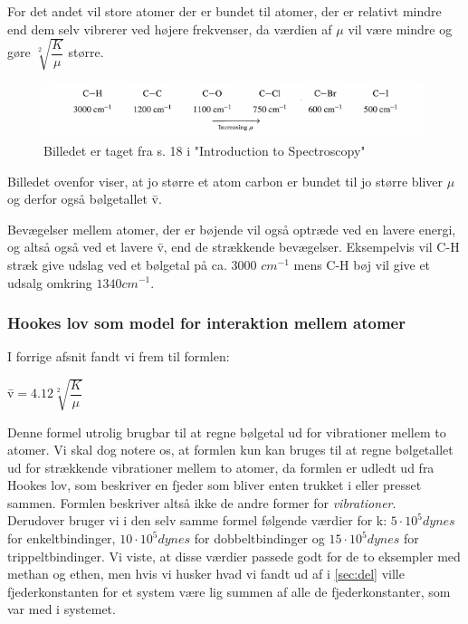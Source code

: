 For det andet vil store atomer der er bundet til atomer, der er relativt mindre end dem selv vibrerer ved højere frekvenser, da værdien af $\mu$ vil være mindre og gøre $\sqrt[2]{\dfrac{K}{\mu}}$ større. 
\\

\begin{figure}
\includegraphics[scale=1]{Billeder/udklip}
\caption{Billedet er taget fra s. 18 i "Introduction to Spectroscopy"}
\end{figure}

Billedet ovenfor viser, at jo større et atom carbon er bundet til jo større bliver $\mu$ og derfor også bølgetallet \={v}.

Bevægelser mellem atomer, der er bøjende vil også optræde ved en lavere energi, og altså også ved et lavere \={v}, end de strækkende bevægelser. Eksempelvis vil C-H stræk give udslag ved et bølgetal på ca. 3000 $cm^{-1}$ mens C-H bøj vil give et udsalg omkring $1340cm^{-1}$.

\subsubsection{Hookes lov som model for interaktion mellem atomer}
I forrige afsnit fandt vi frem til formlen:

\begin{center}
\={v}$=4.12 \sqrt[2]{\dfrac{K}{\mu}}$
\end{center}

Denne formel utrolig brugbar til at regne bølgetal ud for vibrationer mellem to atomer. Vi skal dog notere os, at formlen kun kan bruges til at regne bølgetallet ud for strækkende vibrationer mellem to atomer, da formlen er udledt ud fra Hookes lov, som beskriver en fjeder som bliver enten trukket i eller presset sammen. Formlen beskriver altså ikke de andre former for \emph{vibrationer}.
\\

Derudover bruger vi i den selv samme formel følgende værdier for k: $5 \cdot 10^5 dynes$ for enkeltbindinger, $10 \cdot 10^5 dynes$ for dobbeltbindinger og $15 \cdot 10^5 dynes$ for trippeltbindinger. Vi viste, at disse værdier passede godt for de to eksempler med methan og ethen, men hvis vi husker hvad vi fandt ud af i \ref{sec:del} ville fjederkonstanten for et system være lig summen af alle de fjederkonstanter, som var med i systemet.
\\

